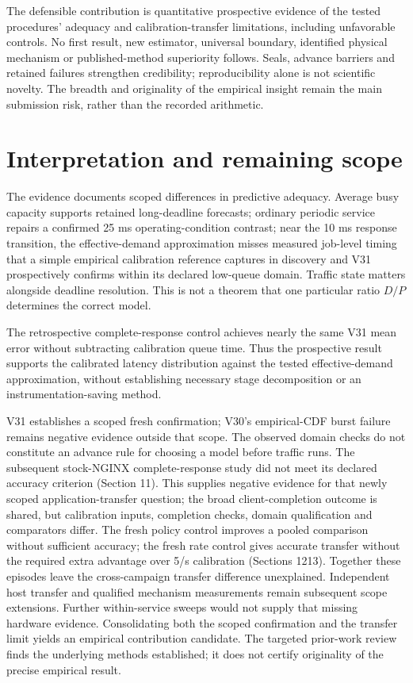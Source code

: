 \documentclass[11pt,a4paper]{article}
\begin{document}
The defensible contribution is quantitative prospective evidence of the tested
procedures' adequacy and calibration-transfer limitations, including unfavorable
controls. No first result, new estimator, universal boundary, identified physical
mechanism or published-method superiority follows. Seals, advance barriers and
retained failures strengthen credibility; reproducibility alone is not scientific
novelty. The breadth and originality of the empirical insight remain the main
submission risk, rather than the recorded arithmetic.

\section{Interpretation and remaining scope}

The evidence documents scoped differences in predictive adequacy. Average busy
capacity supports retained long-deadline forecasts; ordinary periodic service
repairs a confirmed 25 ms operating-condition contrast; near the 10 ms response
transition, the effective-demand approximation misses measured job-level
timing that a simple empirical calibration reference captures in discovery
and V31 prospectively confirms within its declared low-queue domain.
Traffic state matters alongside deadline resolution. This is not a theorem
that one particular ratio $D/P$ determines the correct model.

The retrospective complete-response control achieves nearly the same V31
mean error without subtracting calibration queue time. Thus the prospective
result supports the calibrated latency distribution against the tested
effective-demand approximation, without establishing necessary stage
decomposition or an instrumentation-saving method.

V31 establishes a scoped fresh confirmation; V30's empirical-CDF burst failure
remains negative evidence outside that scope. The observed domain checks do
not constitute an advance rule for choosing a model before traffic runs.
The subsequent stock-NGINX complete-response study did not meet its declared
accuracy criterion (Section 11). This supplies negative evidence for that newly
scoped application-transfer question; the broad client-completion outcome is
shared, but calibration inputs, completion checks, domain qualification and
comparators differ. The fresh policy control improves a pooled comparison
without sufficient accuracy; the fresh rate control gives accurate transfer
without the required extra advantage over 5/s calibration (Sections 12\textendash{}13).
Together these episodes leave the cross-campaign transfer difference unexplained.
Independent host transfer and qualified mechanism
measurements remain subsequent scope extensions. Further within-service sweeps
would not supply that missing hardware evidence. Consolidating both the scoped
confirmation and the transfer limit yields an empirical contribution candidate.
The targeted prior-work review finds the underlying methods
established; it does not certify originality of the precise empirical result.
\end{document}
